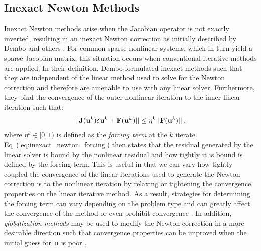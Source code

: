 \subsection{Inexact Newton Methods}
\label{subsec:inexact_newton_methods}
Inexact Newton methods arise when the Jacobian operator is not exactly
inverted, resulting in an inexact Newton correction as initially
described by Dembo and others \citep{dembo_inexact_1982}. For common
sparse nonlinear systems, which in turn yield a sparse Jacobian
matrix, this situation occurs when conventional iterative methods are
applied. In their definition, Dembo formulated inexact methods such
that they are independent of the linear method used to solve for the
Newton correction and therefore are amenable to use with any linear
solver. Furthermore, they bind the convergence of the outer nonlinear
iteration to the inner linear iteration such that:
\begin{equation}
  ||\mathbf{J}(\mathbf{u}^k)\delta \mathbf{u}^k + \mathbf{F}(\mathbf{u}^k)|| \leq \eta^k
  ||\mathbf{F}(\mathbf{u}^k)||\:,
  \label{eq:inexact_newton_forcing}
\end{equation}
where $\eta^k \in [0,1)$ is defined as the \textit{forcing term} at
  the $k$ iterate. Eq~(\ref{eq:inexact_newton_forcing}) then states
  that the residual generated by the linear solver is bound by the
  nonlinear residual and how tightly it is bound is defined by the
  forcing term. This is useful in that we can vary how tightly coupled
  the convergence of the linear iterations used to generate the Newton
  correction is to the nonlinear iteration by relaxing or tightening
  the convergence properties on the linear iterative method. As a
  result, strategies for determining the forcing term can vary
  depending on the problem type and can greatly affect the convergence
  of the method or even prohibit convergence
  \citep{eisenstat_choosing_1996}. In addition, \textit{globalization
    methods} may be used to modify the Newton correction in a more
  desirable direction such that convergence properties can be
  improved when the initial guess for $\mathbf{u}$ is poor
  \citep{pawlowski_globalization_2006}.

